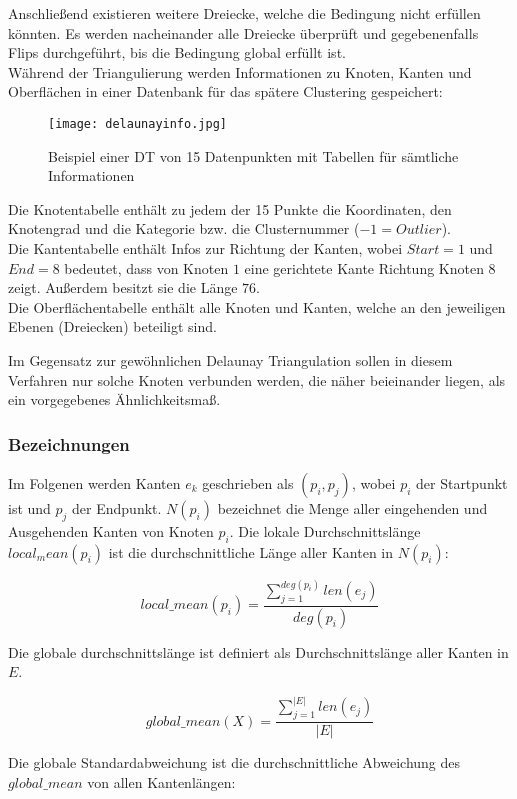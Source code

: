 \documentclass[11pt,ceqn]{book}
\begin{document}
Anschließend existieren weitere Dreiecke, welche die Bedingung nicht erfüllen könnten. Es werden nacheinander alle Dreiecke überprüft und gegebenenfalls Flips durchgeführt, bis die Bedingung global erfüllt ist.
\\

Während der Triangulierung werden Informationen zu Knoten, Kanten und Oberflächen in einer Datenbank für das spätere Clustering gespeichert:

\begin{figure}[H]
\centering
\texttt{[image: delaunayinfo.jpg]}
\caption{Beispiel einer DT von 15 Datenpunkten mit Tabellen für sämtliche Informationen}
\end{figure}

Die Knotentabelle enthält zu jedem der 15 Punkte die Koordinaten, den Knotengrad und die Kategorie bzw. die Clusternummer ($-1 = Outlier$).\\
Die Kantentabelle enthält Infos zur Richtung der Kanten, wobei $Start=1$ und $End=8$ bedeutet, dass von Knoten $1$ eine gerichtete Kante Richtung Knoten 8 zeigt. Außerdem besitzt sie die Länge $76$.
\\
Die Oberflächentabelle enthält alle Knoten und Kanten, welche an den jeweiligen Ebenen (Dreiecken) beteiligt sind.

Im Gegensatz zur gewöhnlichen Delaunay Triangulation sollen in diesem Verfahren nur solche Knoten verbunden werden, die näher beieinander liegen, als ein vorgegebenes Ähnlichkeitsmaß.
\\

\subsubsection{Bezeichnungen}
Im Folgenen werden Kanten $e_k$ geschrieben als $(p_i,p_j)$, wobei $p_i$ der Startpunkt ist und $p_j$ der Endpunkt. $N(p_i)$ bezeichnet die Menge aller eingehenden und Ausgehenden Kanten von Knoten $p_i$. Die lokale Durchschnittslänge $local_mean(p_i)$ ist die durchschnittliche Länge aller Kanten in $N(p_i)$:

$$local\_mean(p_i) =\frac{\sum\limits_{j=1}^{deg(p_i)} len(e_j)}{deg(p_i)}$$

Die globale durchschnittslänge ist definiert als Durchschnittslänge aller Kanten in $E$.

$$global\_mean(X) =\frac{\sum\limits_{j=1}^{|E|} len(e_j)}{|E|}$$

Die globale Standardabweichung ist die durchschnittliche Abweichung des $global\_mean$ von allen Kantenlängen:
\end{document}
